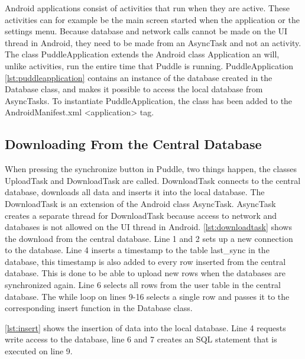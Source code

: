Android applications consist of activities that run when they are active. These activities can for example be the main screen started when the application or the settings menu. Because database and network calls cannot be made on the UI thread in Android, they need to be made from an AsyncTask \citep{asynctask} and not an activity. The class PuddleApplication extends the Android class Application an will, unlike activities, run the entire time that Puddle is running. PuddleApplication \autoref{lst:puddleapplication} contains an instance of the database created in the Database class, and makes it possible to access the local database from AsyncTasks. To instantiate PuddleApplication, the class has been added to the AndroidManifest.xml <application> tag.



\subsection{Downloading From the Central Database}
When pressing the synchronize button in Puddle, two things happen, the classes UploadTask and DownloadTask are called. DownloadTask connects to the central database, downloads all data and inserts it into the local database. The DownloadTask is an extension of the Android class AsyncTask. AsyncTask creates a separate thread for DownloadTask because access to network and databases is not allowed on the UI thread in Android.
\autoref{lst:downloadtask} shows the download from the central database. Line 1 and 2 sets up a new connection to the database. Line 4 inserts a timestamp to the table last\_sync in the database, this timestamp is also added to every row inserted from the central database. This is done to be able to upload new rows when the databases are synchronized again. Line 6 selects all rows from the user table in the central database. The while loop on lines 9-16 selects a single row and passes it to the corresponding insert function in the Database class.



\autoref{lst:insert} shows the insertion of data into the local database. Line 4 requests write access to the database, line 6 and 7 creates an SQL statement that is executed on line 9.

